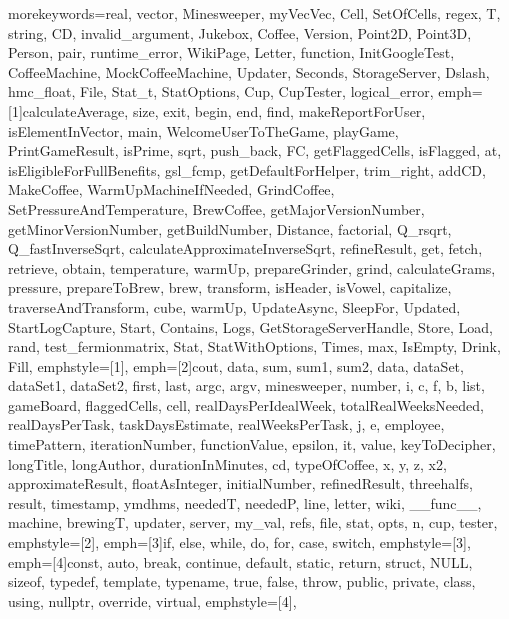 {morekeywords={real, vector, Minesweeper, myVecVec, Cell, SetOfCells, regex, T, string, CD,
              invalid_argument, Jukebox, Coffee, Version, Point2D, Point3D, Person, pair,
              runtime_error, WikiPage, Letter, function, InitGoogleTest, CoffeeMachine,
              MockCoffeeMachine, Updater, Seconds, StorageServer, Dslash, hmc_float, File,
              Stat_t, StatOptions, Cup, CupTester, logical_error},
emph=[1]{calculateAverage, size, exit, begin, end, find, makeReportForUser, isElementInVector,
         main, WelcomeUserToTheGame, playGame, PrintGameResult, isPrime, sqrt, push_back, FC,
         getFlaggedCells, isFlagged, at, isEligibleForFullBenefits, gsl_fcmp, getDefaultForHelper,
         trim_right, addCD, MakeCoffee, WarmUpMachineIfNeeded, GrindCoffee, SetPressureAndTemperature,
         BrewCoffee, getMajorVersionNumber, getMinorVersionNumber, getBuildNumber, Distance, factorial,
         Q_rsqrt, Q_fastInverseSqrt, calculateApproximateInverseSqrt, refineResult, get, fetch, retrieve,
         obtain, temperature, warmUp, prepareGrinder, grind, calculateGrams, pressure, prepareToBrew, brew,
         transform, isHeader, isVowel, capitalize, traverseAndTransform, cube, warmUp, UpdateAsync, SleepFor,
         Updated, StartLogCapture, Start, Contains, Logs, GetStorageServerHandle, Store, Load, rand,
         test_fermionmatrix, Stat, StatWithOptions, Times, max, IsEmpty, Drink, Fill},
emphstyle=[1]{\color{NavyBlue}}, %
emph=[2]{cout, data, sum, sum1, sum2, data, dataSet, dataSet1, dataSet2, first, last, argc, argv, minesweeper,
         number, i, c, f, b, list, gameBoard, flaggedCells, cell, realDaysPerIdealWeek, totalRealWeeksNeeded,
         realDaysPerTask, taskDaysEstimate, realWeeksPerTask, j, e, employee, timePattern, iterationNumber,
         functionValue, epsilon, it, value, keyToDecipher, longTitle, longAuthor, durationInMinutes, cd,
         typeOfCoffee, x, y, z, x2, approximateResult, floatAsInteger, initialNumber, refinedResult,
         threehalfs, result, timestamp, ymdhms, neededT, neededP, line, letter, wiki, __func__, machine,
         brewingT, updater, server, my_val, refs, file, stat, opts, n, cup, tester},
emphstyle=[2]{\color{Orange}}, %
emph=[3]{if, else, while, do, for, case, switch},
emphstyle=[3]{\color{violet}}, %
emph=[4]{const, auto, break, continue, default, static, return, struct, NULL, sizeof, typedef,
         template, typename, true, false, throw, public, private, class, using, nullptr, override, virtual},
emphstyle=[4]{\color{ProcessBlue}}, %
}
